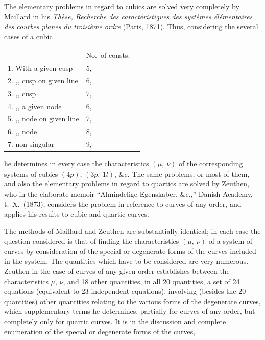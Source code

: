 \documentclass[12pt,a4paper,oneside]{book}
\begin{document}
The elementary problems in regard to cubics are solved very completely by Maillard in his \textit{Th\`ese, Recherche des caract\'eristiques des syst\`emes \'el\'ementaires des courbes planes du troisi\`eme ordre} (Paris, 1871). Thus, considering the several cases of a cubic
\begin{center}
\begin{tabular}{lll}
                                  & No.\ of consts. & \\
1. With a given cusp              & 5,              & \\
2. \quad ,, cusp on given line     & 6,              & \\
3. \quad ,, cusp                  & 7,              & \\
4. \quad ,, a given node          & 6,              & \\
5. \quad ,, node on given line    & 7,              & \\
6. \quad ,, node                  & 8,              & \\
7. non-singular                   & 9,              &
\end{tabular}
\end{center}
he determines in every case the characteristics $(\mu,\ \nu)$ of the corresponding systems of cubics $(4p)$, $(3p,\ 1l)$, \&c. The same problems, or most of them, and also the elementary problems in regard to quartics are solved by Zeuthen, who in the elaborate memoir ``Almindelige Egenskaber, \&c.,'' Danish Academy, t.~X.\ (1873), considers the problem in reference to curves of any order, and applies his results to cubic and quartic curves.

The methods of Maillard and Zeuthen are substantially identical; in each case the question considered is that of finding the characteristics $(\mu,\ \nu)$ of a system of curves by consideration of the special or degenerate forms of the curves included in the system. The quantities which have to be considered are very numerous. Zeuthen in the case of curves of any given order establishes between the characteristics $\mu$, $\nu$, and 18 other quantities, in all 20 quantities, a set of 24 equations (equivalent to 23 independent equations), involving (besides the 20 quantities) other quantities relating to the various forms of the degenerate curves, which supplementary terms he determines, partially for curves of any order, but completely only for quartic curves. It is in the discussion and complete enumeration of the special or degenerate forms of the curves,
\end{document}

